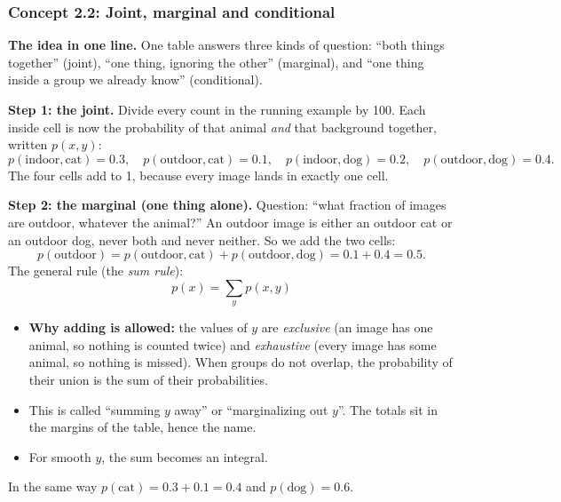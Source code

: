 \documentclass[12pt,a4paper]{article}
\begin{document}
\subsubsection{Concept 2.2: Joint, marginal and conditional}\label{c2-2}

\textbf{The idea in one line.} One table answers three kinds of question: ``both things together'' (joint), ``one thing, ignoring the other'' (marginal), and ``one thing inside a group we already know'' (conditional).

\textbf{Step 1: the joint.} Divide every count in the running example by 100. Each inside cell is now the probability of that animal \emph{and} that background together, written $p(x,y)$:
\[
p(\text{indoor},\text{cat})=0.3,\quad p(\text{outdoor},\text{cat})=0.1,\quad p(\text{indoor},\text{dog})=0.2,\quad p(\text{outdoor},\text{dog})=0.4 .
\]
The four cells add to 1, because every image lands in exactly one cell.

\textbf{Step 2: the marginal (one thing alone).} Question: ``what fraction of images are outdoor, whatever the animal?'' An outdoor image is either an outdoor cat or an outdoor dog, never both and never neither. So we add the two cells:
\[
p(\text{outdoor})=p(\text{outdoor},\text{cat})+p(\text{outdoor},\text{dog})=0.1+0.4=0.5 .
\]
The general rule (the \emph{sum rule}):
\[
p(x)=\sum_y p(x,y)
\]
\begin{itemize}[nosep]
  \item \textbf{Why adding is allowed:} the values of $y$ are \emph{exclusive} (an image has one animal, so nothing is counted twice) and \emph{exhaustive} (every image has some animal, so nothing is missed). When groups do not overlap, the probability of their union is the sum of their probabilities.
  \item This is called ``summing $y$ away'' or ``marginalizing out $y$''. The totals sit in the margins of the table, hence the name.
  \item For smooth $y$, the sum becomes an integral.
\end{itemize}
In the same way $p(\text{cat})=0.3+0.1=0.4$ and $p(\text{dog})=0.6$.
\end{document}
